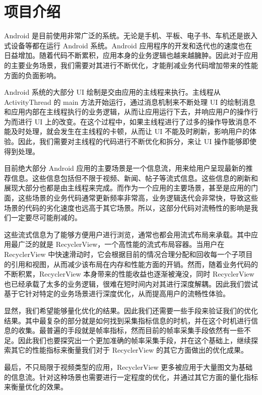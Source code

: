 \chapter{项目介绍}

Android 是目前使用非常广泛的系统\cite{businge2019studying}。无论是手机、平板、电子书、车机还是嵌入式设备等都在运行 Android 系统。Android 应用程序的开发和迭代也的速度也在日益增加。随着代码不断累积，应用本身的业务逻辑也越来越臃肿。因此对于应用的主要业务场景，我们需要对其进行不断优化，才能削减业务代码增加带来的性能方面的负面影响。

Android 系统的大部分 UI 绘制是交由应用的主线程来执行\cite{yan2014real}。主线程从 ActivityThread 的 main 方法开始运行，通过消息机制来不断处理 UI 的绘制消息和应用内部在主线程执行的业务逻辑，从而让应用运行下去，并响应用户的操作行为而进行 UI 上的改变。在这个过程中，如果主线程进行了过多的操作导致消息不能及时处理，就会发生在主线程的卡顿，从而让 UI 不能及时刷新，影响用户的体验。因此，我们需要对主线程的代码进行不断优化和拆分，来让 UI 操作能够即使得到处理。

目前绝大部分 Android 应用的主要场景是一个信息流，用来给用户呈现最新的推荐信息。这些信息包括但不限于视频、新闻、帖子等流式信息。这些信息的刷新和展现大部分也都是由主线程来完成。而作为一个应用的主要场景，甚至是应用的门面，这些场景的业务代码通常更新频率非常高，业务逻辑迭代会非常快，导致这些场景的代码的劣化速度也远高于其它场景。所以，这部分代码对流畅性的影响是我们一定要尽可能削减的。

这些流式信息为了能够方便用户进行浏览，通常也都会用流式布局来承载。其中应用最广泛的就是 RecyclerView，一个高性能的流式布局容器\cite{sabiyath2020enhanced}。当用户在 RecyclerView 中快速滑动时，它会根据目前的情况合理分配和回收每一个子项目的引用和视图，从而减少该布局在内存和性能方面的开销。然而，随着业务代码的不断积累，RecyclerView 本身带来的性能收益也逐渐被淹没，同时 RecyclerView 也已经承载了太多的业务逻辑，很难在短时间内对其进行深度解耦。因此我们尝试基于它针对特定的业务场景进行深度优化，从而提高用户的流畅性体验。

显然，我们希望能够量化优化的结果。因此我们还需要一些手段来验证我们的优化结果。其中最复杂的部分就是如何找到采集指标信息的时机，并在这个时机进行信息的收集。最普遍的手段就是帧率指标，然而目前的帧率采集手段依然有一些不足。因此我们也要探究出一个更加准确的帧率采集手段，并在这个基础上，继续探索其它的性能指标来衡量我们对于 RecyclerView 的其它方面做出的优化成果。

最后，不只局限于视频类型的应用，RecyclerView 更多被应用于大量图文为基础的信息流。针对这种场景也需要进行一定程度的优化，并通过其它方面的量化指标来衡量优化的效果。